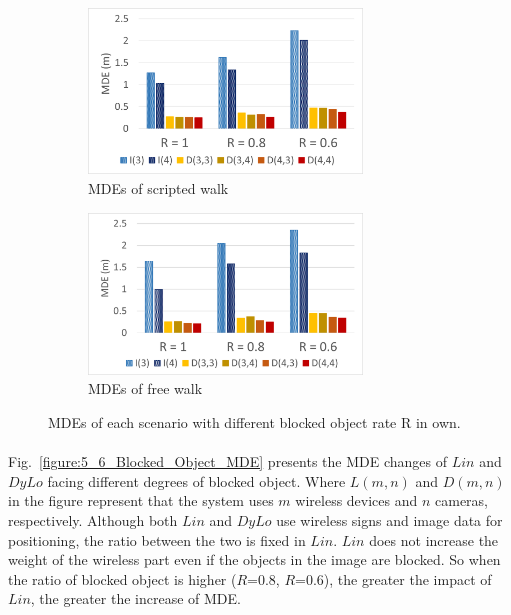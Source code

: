 \documentclass[a4paper,12pt]{report}
\begin{document}
\begin{figure}[tbph]%
    \begin{subfigure}{1\linewidth}
    \centering
        \includegraphics[width=0.8\textwidth]{images/5_6_Blocked_Object_Own_MDE_SW.png}
        \caption{MDEs of scripted walk}
        \label{figure:5_6_Blocked_Object_Own_MDE_SW}
    \end{subfigure}
    \begin{subfigure}{1\linewidth}
    \centering
        \includegraphics[width=0.8\textwidth]{images/5_6_Blocked_Object_Own_MDE_FW.png}
        \caption{MDEs of free walk}
        \label{figure:5_6_Blocked_Object_Own_MDE_FW}
    \end{subfigure}
\caption{MDEs of each scenario with different blocked object rate R in own.}
\label{figure:5_6_Blocked_Object_Own_MDE}
\end{figure}

\paragraph{}
Fig.~\ref{figure:5_6_Blocked_Object_MDE} presents the MDE changes of $Lin$ and $DyLo$ facing different degrees of blocked object. Where $L(m,n)$ and $D(m,n)$ in the figure represent that the system uses $m$ wireless devices and $n$ cameras, respectively. Although both $Lin$ and $DyLo$ use wireless signs and image data for positioning, the ratio between the two is fixed in $Lin$. $Lin$ does not increase the weight of the wireless part even if the objects in the image are blocked. So when the ratio of blocked object is higher ($R$=0.8, $R$=0.6), the greater the impact of $Lin$, the greater the increase of MDE.
\end{document}
